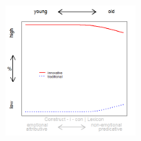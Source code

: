 \documentclass[12pt, table]{beamer}
\begin{document}
\begin{frame}
\begin{minipage}[t]{\linewidth}
\begin{minipage}{.45\linewidth}
\begin{tabular}{cccccccccc }
\end{tabular}
\end{minipage}
\hfill
\begin{minipage}{.45\linewidth}
\begin{figure}
\includegraphics[width=5cm]{images/LangChang20.png}
\end{figure}
\end{minipage}
\end{minipage}
\end{frame}
\end{document}
